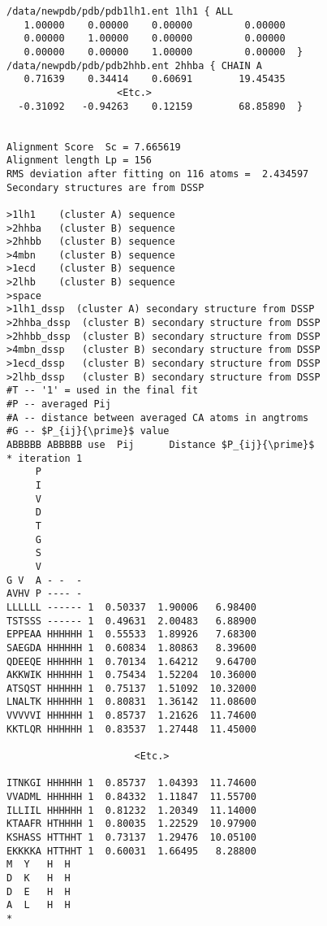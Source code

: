 \begin{scriptsize}\begin{verbatim}
/data/newpdb/pdb/pdb1lh1.ent 1lh1 { ALL 
   1.00000    0.00000    0.00000         0.00000 
   0.00000    1.00000    0.00000         0.00000 
   0.00000    0.00000    1.00000         0.00000  }
/data/newpdb/pdb/pdb2hhb.ent 2hhba { CHAIN A 
   0.71639    0.34414    0.60691        19.45435 
                   <Etc.>
  -0.31092   -0.94263    0.12159        68.85890  }


Alignment Score  Sc = 7.665619
Alignment length Lp = 156
RMS deviation after fitting on 116 atoms =  2.434597
Secondary structures are from DSSP

>1lh1    (cluster A) sequence
>2hhba   (cluster B) sequence
>2hhbb   (cluster B) sequence
>4mbn    (cluster B) sequence
>1ecd    (cluster B) sequence
>2lhb    (cluster B) sequence
>space 
>1lh1_dssp  (cluster A) secondary structure from DSSP
>2hhba_dssp  (cluster B) secondary structure from DSSP
>2hhbb_dssp  (cluster B) secondary structure from DSSP
>4mbn_dssp   (cluster B) secondary structure from DSSP
>1ecd_dssp   (cluster B) secondary structure from DSSP
>2lhb_dssp   (cluster B) secondary structure from DSSP
#T -- '1' = used in the final fit
#P -- averaged Pij
#A -- distance between averaged CA atoms in angtroms
#G -- $P_{ij}{\prime}$ value
ABBBBB ABBBBB use  Pij      Distance $P_{ij}{\prime}$
* iteration 1
     P
     I
     V
     D
     T
     G
     S
     V
G V  A - -  - 
AVHV P ---- - 
LLLLLL ------ 1  0.50337  1.90006   6.98400 
TSTSSS ------ 1  0.49631  2.00483   6.88900 
EPPEAA HHHHHH 1  0.55533  1.89926   7.68300 
SAEGDA HHHHHH 1  0.60834  1.80863   8.39600 
QDEEQE HHHHHH 1  0.70134  1.64212   9.64700 
AKKWIK HHHHHH 1  0.75434  1.52204  10.36000 
ATSQST HHHHHH 1  0.75137  1.51092  10.32000 
LNALTK HHHHHH 1  0.80831  1.36142  11.08600 
VVVVVI HHHHHH 1  0.85737  1.21626  11.74600 
KKTLQR HHHHHH 1  0.83537  1.27448  11.45000 

                      <Etc.>

ITNKGI HHHHHH 1  0.85737  1.04393  11.74600 
VVADML HHHHHH 1  0.84332  1.11847  11.55700 
ILLIIL HHHHHH 1  0.81232  1.20349  11.14000 
KTAAFR HTHHHH 1  0.80035  1.22529  10.97900 
KSHASS HTTHHT 1  0.73137  1.29476  10.05100 
EKKKKA HTTHHT 1  0.60031  1.66495   8.28800 
M  Y   H  H   
D  K   H  H   
D  E   H  H   
A  L   H  H   
*
\end{verbatim} \end{scriptsize}

